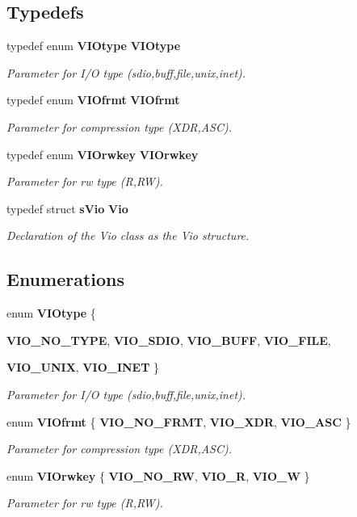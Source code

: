 \subsection*{Typedefs}
\begin{DoxyCompactItemize}
\item 
typedef enum {\bf VIOtype} {\bf VIOtype}
\begin{DoxyCompactList}\small\item\em Parameter for I/O type (sdio,buff,file,unix,inet). \item\end{DoxyCompactList}\item 
typedef enum {\bf VIOfrmt} {\bf VIOfrmt}
\begin{DoxyCompactList}\small\item\em Parameter for compression type (XDR,ASC). \item\end{DoxyCompactList}\item 
typedef enum {\bf VIOrwkey} {\bf VIOrwkey}
\begin{DoxyCompactList}\small\item\em Parameter for rw type (R,RW). \item\end{DoxyCompactList}\item 
typedef struct {\bf sVio} {\bf Vio}
\begin{DoxyCompactList}\small\item\em Declaration of the Vio class as the Vio structure. \item\end{DoxyCompactList}\end{DoxyCompactItemize}
\subsection*{Enumerations}
\begin{DoxyCompactItemize}
\item 
enum {\bf VIOtype} \{ \par
{\bf VIO\_\-NO\_\-TYPE}, 
{\bf VIO\_\-SDIO}, 
{\bf VIO\_\-BUFF}, 
{\bf VIO\_\-FILE}, 
\par
{\bf VIO\_\-UNIX}, 
{\bf VIO\_\-INET}
 \}
\begin{DoxyCompactList}\small\item\em Parameter for I/O type (sdio,buff,file,unix,inet). \item\end{DoxyCompactList}\item 
enum {\bf VIOfrmt} \{ {\bf VIO\_\-NO\_\-FRMT}, 
{\bf VIO\_\-XDR}, 
{\bf VIO\_\-ASC}
 \}
\begin{DoxyCompactList}\small\item\em Parameter for compression type (XDR,ASC). \item\end{DoxyCompactList}\item 
enum {\bf VIOrwkey} \{ {\bf VIO\_\-NO\_\-RW}, 
{\bf VIO\_\-R}, 
{\bf VIO\_\-W}
 \}
\begin{DoxyCompactList}\small\item\em Parameter for rw type (R,RW). \item\end{DoxyCompactList}\end{DoxyCompactItemize}
